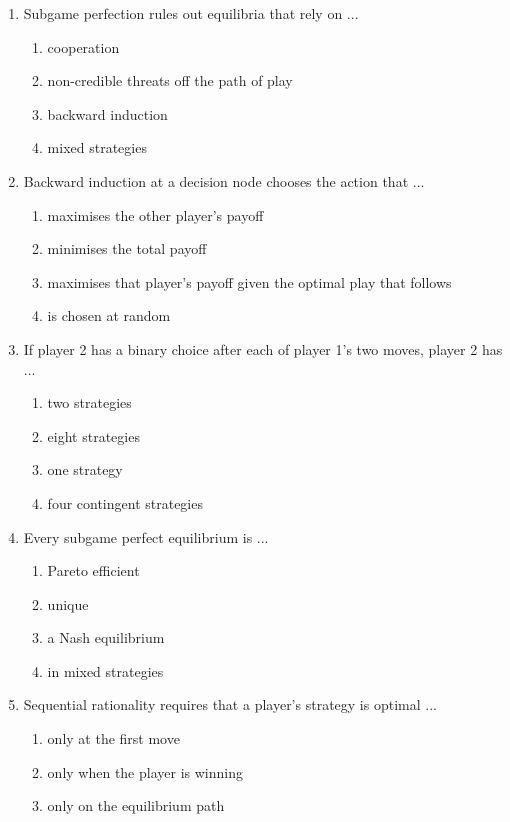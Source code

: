 \documentclass[11pt]{article}
\begin{document}
\begin{enumerate}[itemsep=6pt]
\begin{enumerate}
    \item an action at every decision node of the player
  \end{enumerate}
  \item Subgame perfection rules out equilibria that rely on ...
  \begin{enumerate}
    \item cooperation
    \item non-credible threats off the path of play
    \item backward induction
    \item mixed strategies
  \end{enumerate}
  \item Backward induction at a decision node chooses the action that ...
  \begin{enumerate}
    \item maximises the other player's payoff
    \item minimises the total payoff
    \item maximises that player's payoff given the optimal play that follows
    \item is chosen at random
  \end{enumerate}
  \item If player 2 has a binary choice after each of player 1's two moves, player 2 has ...
  \begin{enumerate}
    \item two strategies
    \item eight strategies
    \item one strategy
    \item four contingent strategies
  \end{enumerate}
  \item Every subgame perfect equilibrium is ...
  \begin{enumerate}
    \item Pareto efficient
    \item unique
    \item a Nash equilibrium
    \item in mixed strategies
  \end{enumerate}
  \item Sequential rationality requires that a player's strategy is optimal ...
  \begin{enumerate}
    \item only at the first move
    \item only when the player is winning
    \item only on the equilibrium path

\end{enumerate}
\end{enumerate}
\end{document}
